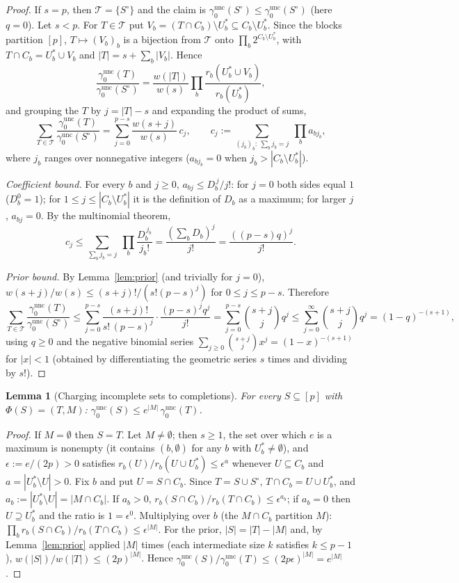 \documentclass[11pt]{article}
\newtheorem{lemma}{Lemma}
\theoremstyle{remark}
\newcommand{\unc}{\mathrm{unc}}
\newcommand{\gu}{\gamma_0^{\unc}}
\begin{document}
\begin{proof}
If $s=p$, then $\mathcal T=\{S^\circ\}$ and the claim is $\gu(S^\circ)\le\gu(S^\circ)$ (here $q=0$). Let $s<p$. For $T\in\mathcal T$ put $V_b=(T\cap C_b)\setminus U_b^*\subseteq C_b\setminus U_b^*$. Since the blocks partition $[p]$, $T\mapsto(V_b)_b$ is a bijection from $\mathcal T$ onto $\prod_b 2^{C_b\setminus U_b^*}$, with $T\cap C_b=U_b^*\cup V_b$ and $|T|=s+\sum_b|V_b|$. Hence
\[
\frac{\gu(T)}{\gu(S^\circ)}=\frac{w(|T|)}{w(s)}\prod_b\frac{r_b(U_b^*\cup V_b)}{r_b(U_b^*)} ,
\]
and grouping the $T$ by $j=|T|-s$ and expanding the product of sums,
\[
\sum_{T\in\mathcal T}\frac{\gu(T)}{\gu(S^\circ)}=\sum_{j=0}^{p-s}\frac{w(s+j)}{w(s)}\,c_j,\qquad c_j:=\sum_{(j_b)_b:\ \sum_b j_b=j}\ \prod_b a_{b j_b},
\]
where $j_b$ ranges over nonnegative integers ($a_{bj_b}=0$ when $j_b>|C_b\setminus U_b^*|$).

\emph{Coefficient bound.} For every $b$ and $j\ge0$, $a_{bj}\le D_b^{\,j}/j!$: for $j=0$ both sides equal $1$ ($D_b^0=1$); for $1\le j\le|C_b\setminus U_b^*|$ it is the definition of $D_b$ as a maximum; for larger $j$, $a_{bj}=0$. By the multinomial theorem,
\[
c_j\le\sum_{\sum_b j_b=j}\ \prod_b\frac{D_b^{\,j_b}}{j_b!}=\frac{(\sum_b D_b)^j}{j!}=\frac{((p-s)q)^j}{j!}.
\]

\emph{Prior bound.} By Lemma~\ref{lem:prior} (and trivially for $j=0$), $w(s+j)/w(s)\le (s+j)!/(s!(p-s)^j)$ for $0\le j\le p-s$. Therefore
\[
\sum_{T\in\mathcal T}\frac{\gu(T)}{\gu(S^\circ)}\le\sum_{j=0}^{p-s}\frac{(s+j)!}{s!\,(p-s)^j}\cdot\frac{(p-s)^jq^j}{j!}=\sum_{j=0}^{p-s}\binom{s+j}{j}q^j\le\sum_{j=0}^{\infty}\binom{s+j}{j}q^j=(1-q)^{-(s+1)},
\]
using $q\ge0$ and the negative binomial series $\sum_{j\ge0}\binom{s+j}{j}x^j=(1-x)^{-(s+1)}$ for $|x|<1$ (obtained by differentiating the geometric series $s$ times and dividing by $s!$).
\end{proof}

\begin{lemma}[Charging incomplete sets to completions]\label{lem:charge}
For every $S\subseteq[p]$ with $\Phi(S)=(T,M)$: $\gu(S)\le e^{|M|}\,\gu(T)$.
\end{lemma}

\begin{proof}
If $M=\emptyset$ then $S=T$. Let $M\neq\emptyset$; then $s\ge1$, the set over which $e$ is a maximum is nonempty (it contains $(b,\emptyset)$ for any $b$ with $U_b^*\neq\emptyset$), and $\epsilon:=e/(2p)>0$ satisfies $r_b(U)/r_b(U\cup U_b^*)\le\epsilon^{a}$ whenever $U\subseteq C_b$ and $a=|U_b^*\setminus U|>0$. Fix $b$ and put $U=S\cap C_b$. Since $T=S\cup S^\circ$, $T\cap C_b=U\cup U_b^*$, and $a_b:=|U_b^*\setminus U|=|M\cap C_b|$. If $a_b>0$, $r_b(S\cap C_b)/r_b(T\cap C_b)\le\epsilon^{a_b}$; if $a_b=0$ then $U\supseteq U_b^*$ and the ratio is $1=\epsilon^0$. Multiplying over $b$ (the $M\cap C_b$ partition $M$): $\prod_b r_b(S\cap C_b)/r_b(T\cap C_b)\le\epsilon^{|M|}$. For the prior, $|S|=|T|-|M|$ and, by Lemma~\ref{lem:prior} applied $|M|$ times (each intermediate size $k$ satisfies $k\le p-1$), $w(|S|)/w(|T|)\le(2p)^{|M|}$. Hence $\gu(S)/\gu(T)\le(2p\epsilon)^{|M|}=e^{|M|}$.
\end{proof}
\end{document}

